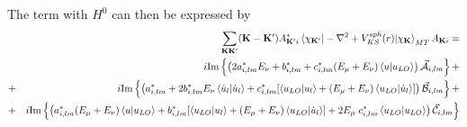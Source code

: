 \documentclass[aps,prb,floatfix,epsfig,singlecolumn,showpacs,preprintnumbers]{revtex4}
\newcommand{\vK}{{\mathbf{K}}}
\renewcommand{\Im}{\textrm{Im}}
\newcommand{\vcA}{\vec{\cal A}}
\newcommand{\vcB}{\vec{\cal B}}
\newcommand{\vcC}{\vec{\cal C}}
\begin{document}
The term with $H^0$ can then be expressed by
\begin{eqnarray}
&& \sum_{\vK\vK'} (\vK-\vK')  A^*_{\vK'   i}\braket{\chi_{\vK'}|-\nabla^2+V_{KS}^{sph}(r)|\chi_\vK}_{MT}A_{\vK   i}=
\nonumber\\
&& i\Im\left\{
\left( 2 a_{i,lm}^* E_\nu + b_{i,lm}^* +   c^*_{i,lm} (E_{\mu}+E_\nu) \braket{u|u_{LO}} \right)\vcA_{i,lm}
\right\}+
%
\nonumber\\
&+& i\Im\left\{
\left(
a_{i,lm}^* +2 b_{i,lm}^* E_\nu \braket{\dot{u}_l|\dot{u}_l} +
c^*_{i,lm}  [ \braket{u_{LO}|u_l}  +    (E_\mu+E_\nu)\braket{u_{LO}|\dot{u}_l} ]\right)\vcB_{i,lm}
\right\}+
\nonumber\\
&+& i\Im\left\{
\left( 
a^*_{i,lm} (E_{\mu}+E_\nu) \braket{u|u_{LO}} 
+ b^*_{i,lm}  [ \braket{u_{LO}|u_l} + (E_\mu+E_\nu)\braket{u_{LO}|\dot{u}_l} ]
+ 2 E_\mu\; c^*_{i,lm}  \braket{u_{LO}|u_{LO}}
\right)\vcC_{i,lm} 
\right\}
\end{eqnarray}
\end{document}
